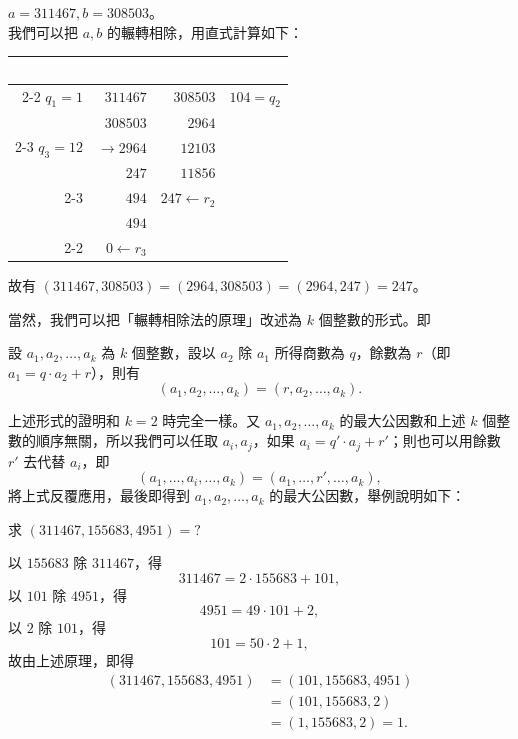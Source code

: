 \begin{example}\label{ex:6-2-3}
$a=311467, b=308503$。\\
我們可以把 $a, b$ 的輾轉相除，用直式計算如下：
\begin{center}
\renewcommand{\arraystretch}{1.2}
\begin{tabular}{r|r|r|l}
\multicolumn{1}{c}{} & \multicolumn{1}{c}{~~} & \multicolumn{1}{c}{~~} & \\ \cline{2-2}
$q_1 = 1$ & $311467$ & $308503$ & $104 = q_2$ \\
          & $308503$ & $2964$   & \\ \cline{2-3}
$q_3 = 12$ & $\rightarrow 2964$ & $12103$ & \\
          & $247$    & $11856$  & \\ \cline{2-3}
          & $494$    & $247 \leftarrow r_2$ & \\
          & $494$    &          & \\ \cline{2-2}
          & $0 \leftarrow r_3$ & & 
\end{tabular}
\end{center}
故有 $(311467, 308503) = (2964, 308503) = (2964, 247) = 247$。
\end{example}

當然，我們可以把「輾轉相除法的原理」改述為 $k$ 個整數的形式。即

設 $a_1, a_2, \dots, a_k$ 為 $k$ 個整數，設以 $a_2$ 除 $a_1$ 所得商數為 $q$，餘數為 $r$（即 $a_1 = q \cdot a_2 + r$），則有
\begin{equation*}
  (a_1, a_2, \dots, a_k) = (r, a_2, \dots, a_k).
\end{equation*}

上述形式的證明和 $k=2$ 時完全一樣。又 $a_1, a_2, \dots, a_k$ 的最大公因數和上述 $k$ 個整數的順序無關，所以我們可以任取 $a_i, a_j$，如果 $a_i = q' \cdot a_j + r'$；則也可以用餘數 $r'$ 去代替 $a_i$，即
\begin{equation*}
  (a_1, \dots, a_i, \dots, a_k) = (a_1, \dots, r', \dots, a_k),
\end{equation*}
將上式反覆應用，最後即得到 $a_1, a_2, \dots, a_k$ 的最大公因數，舉例說明如下：

\begin{example}\label{ex:6-2-4}
求 $(311467, 155683, 4951) = ?$

以 $155683$ 除 $311467$，得
\begin{equation*}
  311467 = 2 \cdot 155683 + 101,
\end{equation*}
以 $101$ 除 $4951$，得
\begin{equation*}
  4951 = 49 \cdot 101 + 2,
\end{equation*}
以 $2$ 除 $101$，得
\begin{equation*}
  101 = 50 \cdot 2 + 1,
\end{equation*}
故由上述原理，即得
\begin{align*}
  (311467, 155683, 4951) &= (101, 155683, 4951) \\
  &= (101, 155683, 2) \\
  &= (1, 155683, 2) = 1.
\end{align*}
\end{example}

